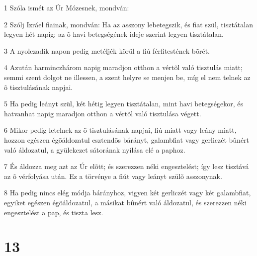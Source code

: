 \par 1 Szóla ismét az Úr Mózesnek, mondván:
\par 2 Szólj Izráel fiainak, mondván: Ha az asszony lebetegszik, és fiat szül, tisztátalan legyen hét napig; az õ havi betegségének ideje szerint legyen tisztátalan.
\par 3 A nyolczadik napon pedig metéljék körül a fiú férfitestének bõrét.
\par 4 Azután harminczhárom napig maradjon otthon a vértõl való tisztulás miatt; semmi szent dolgot ne illessen, a szent helyre se menjen be, míg el nem telnek az õ tisztulásának napjai.
\par 5 Ha pedig leányt szül, két hétig legyen tisztátalan, mint havi betegségekor, és hatvanhat napig maradjon otthon a vértõl való tisztulása végett.
\par 6 Mikor pedig letelnek az õ tisztulásának napjai, fiú miatt vagy leány miatt, hozzon egészen égõáldozatul esztendõs bárányt, galambfiat vagy gerliczét bûnért való áldozatul, a gyülekezet sátorának nyílása elé a paphoz.
\par 7 És áldozza meg azt az Úr elõtt; és szerezzen néki engesztelést; így lesz tisztává az õ vérfolyása után. Ez a törvénye a fiút vagy leányt szülõ asszonynak.
\par 8 Ha pedig nincs elég módja bárányhoz, vigyen két gerliczét vagy két galambfiat, egyiket egészen égõáldozatul, a másikat bûnért való áldozatul, és szerezzen néki engesztelést a pap, és tiszta lesz.

\chapter{13}

